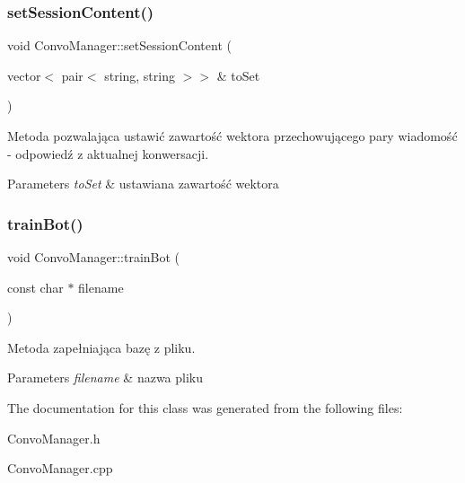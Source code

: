 \subsubsection{\texorpdfstring{setSessionContent()}{setSessionContent()}}
{\footnotesize\ttfamily void Convo\+Manager\+::set\+Session\+Content (\begin{DoxyParamCaption}\item[{vector$<$ pair$<$ string, string $>$$>$ \&}]{to\+Set }\end{DoxyParamCaption})}



Metoda pozwalająca ustawić zawartość wektora przechowującego pary wiadomość -\/ odpowiedź z aktualnej konwersacji. 


\begin{DoxyParams}{Parameters}
{\em to\+Set} & ustawiana zawartość wektora \\
\hline
\end{DoxyParams}
\mbox{\label{class_convo_manager_aa241628ae813de8b641b227b1b5ce9f8}} 
\subsubsection{\texorpdfstring{trainBot()}{trainBot()}}
{\footnotesize\ttfamily void Convo\+Manager\+::train\+Bot (\begin{DoxyParamCaption}\item[{const char $\ast$}]{filename }\end{DoxyParamCaption})}



Metoda zapełniająca bazę z pliku. 


\begin{DoxyParams}{Parameters}
{\em filename} & nazwa pliku \\
\hline
\end{DoxyParams}


The documentation for this class was generated from the following files\+:\begin{DoxyCompactItemize}
\item 
Convo\+Manager.\+h\item 
Convo\+Manager.\+cpp\end{DoxyCompactItemize}
